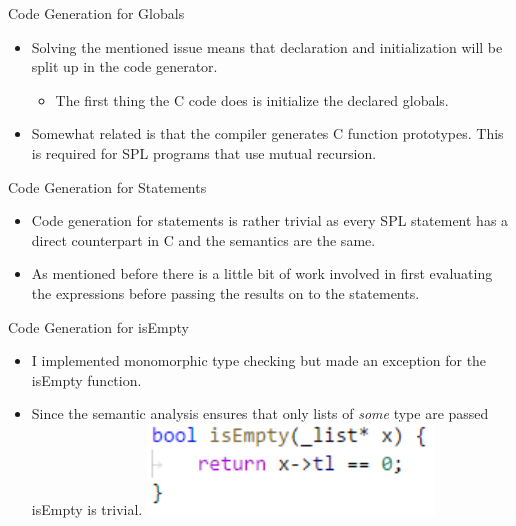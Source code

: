 \documentclass[10pt]{beamer}
\begin{document}
\begin{frame}{Code Generation for Globals}
    \begin{itemize}
        \item Solving the mentioned issue means that declaration and initialization will be split up in the code generator.
        \begin{itemize}
            \item The first thing the C code does is initialize the declared globals.
        \end{itemize}
        \item Somewhat related is that the compiler generates C function prototypes. This is required for SPL programs that use mutual recursion.
    \end{itemize}
\end{frame}

\begin{frame}{Code Generation for Statements}
    \begin{itemize}
        \item Code generation for statements is rather trivial as every SPL statement has a direct counterpart in C and the semantics are the same.
        \item As mentioned before there is a little bit of work involved in first evaluating the expressions before passing the results on to the statements.
    \end{itemize}
\end{frame}

\begin{frame}{Code Generation for isEmpty}
    \begin{itemize}
        \item I implemented monomorphic type checking but made an exception for the isEmpty function.
        \item Since the semantic analysis ensures that only lists of \textit{some} type are passed isEmpty is trivial.
        \includegraphics[width=0.6\textwidth]{presentation4/6.png}
    \end{itemize}
\end{frame}
\end{document}
